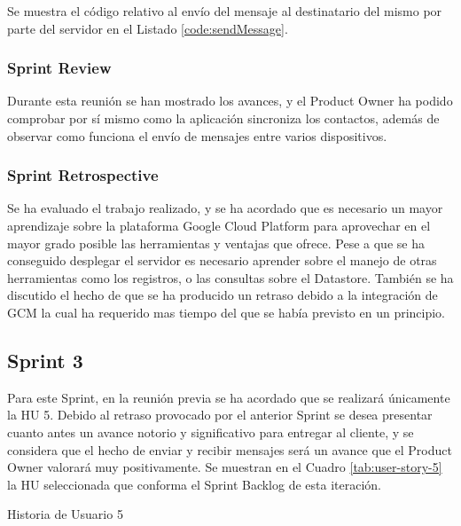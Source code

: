 Se muestra el código relativo al envío del mensaje al destinatario del mismo por parte del servidor en el Listado \ref{code:sendMessage}.\\



\subsubsection{Sprint Review}

Durante esta reunión se han mostrado los avances, y el Product Owner ha podido comprobar por sí mismo como la aplicación sincroniza los contactos, además de observar como funciona el envío de mensajes entre varios dispositivos.

\subsubsection{Sprint Retrospective}

Se ha evaluado el trabajo realizado, y se ha acordado que es necesario un mayor aprendizaje sobre la plataforma Google Cloud Platform para aprovechar en el mayor grado posible las herramientas y ventajas que ofrece. Pese a que se ha conseguido desplegar el servidor es necesario aprender sobre el manejo de otras herramientas como los registros, o las consultas sobre el Datastore. También se ha discutido el hecho de que se ha producido un retraso debido a la integración de \ac{GCM} la cual ha requerido mas tiempo del que se había previsto en un principio.


\subsection{Sprint 3}

Para este Sprint, en la reunión previa se ha acordado que se realizará únicamente la \ac{HU} 5. Debido al retraso provocado por el anterior Sprint se desea presentar cuanto antes un avance notorio y significativo para entregar al cliente, y se considera que el hecho de enviar y recibir mensajes será un avance que el Product Owner valorará muy positivamente. Se muestran en el Cuadro \ref{tab:user-story-5} la \ac{HU} seleccionada que conforma el Sprint Backlog  de esta iteración.

\begin{table}[hp]
  \centering
  {\small
  
  }
  \caption{Historia de Usuario 5}
  \label{tab:user-story-5}
\end{table}



